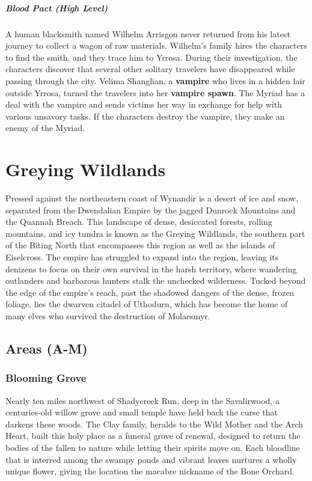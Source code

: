 \documentclass[10pt,a4paper,twoside,bg=print,twocolumn,openany,nodeprecatedcode]{dndbook}
\begin{document}
\subparagraph{Blood Pact (High Level)}
A human blacksmith named Wilhelm Arrisgon never returned from his latest journey to collect a wagon of raw materials. Wilhelm's family hires the characters to find the smith, and they trace him to Yrrosa. During their investigation, the characters discover that several other solitary travelers have disappeared while passing through the city. Velima Shanglian, a \textbf{vampire} who lives in a hidden lair outside Yrrosa, turned the travelers into her \textbf{vampire spawn}. The Myriad has a deal with the vampire and sends victims her way in exchange for help with various unsavory tasks. If the characters destroy the vampire, they make an enemy of the Myriad.

\section{Greying Wildlands}
Pressed against the northeastern coast of Wynandir is a desert of ice and snow, separated from the Dwendalian Empire by the jagged Dunrock Mountains and the Quannah Breach. This landscape of dense, desiccated forests, rolling mountains, and icy tundra is known as the Greying Wildlands, the southern part of the Biting North that encompasses this region as well as the islands of Eiselcross. The empire has struggled to expand into the region, leaving its denizens to focus on their own survival in the harsh territory, where wandering outlanders and barbarous hunters stalk the unchecked wilderness. Tucked beyond the edge of the empire's reach, past the shadowed dangers of the dense, frozen foliage, lies the dwarven citadel of Uthodurn, which has become the home of many elves who survived the destruction of Molaesmyr.

\subsection{Areas (A-M)}
\subsubsection{Blooming Grove}
Nearly ten miles northwest of Shadycreek Run, deep in the Savalirwood, a centuries-old willow grove and small temple have held back the curse that darkens these woods. The Clay family, heralds to the Wild Mother and the Arch Heart, built this holy place as a funeral grove of renewal, designed to return the bodies of the fallen to nature while letting their spirits move on. Each bloodline that is interred among the swampy ponds and vibrant leaves nurtures a wholly unique flower, giving the location the macabre nickname of the Bone Orchard.
\end{document}
